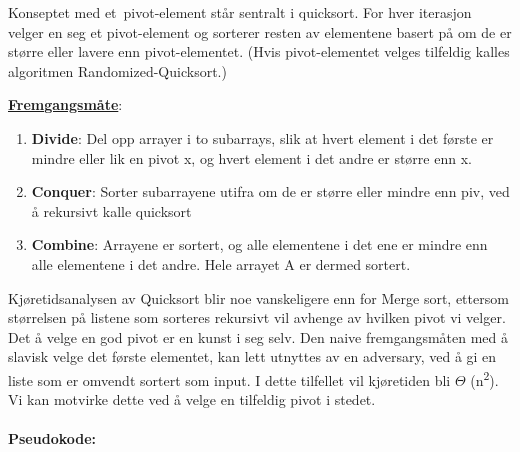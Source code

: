 \documentclass[12pt]{report}
\begin{document}
\setlength{\parskip}{0.0pt}
Konseptet med et pivot-element står sentralt i quicksort. For hver iterasjon velger en seg et pivot-element og sorterer resten av elementene basert på om de er større eller lavere enn pivot-elementet. (Hvis pivot-elementet velges tilfeldig kalles algoritmen Randomized-Quicksort.)\par

\textbf{\uline{Fremgangsmåte}}:\par

\begin{enumerate}[label*=\arabic*.]
	\item \textbf{Divide}: Del opp arrayer i to subarrays, slik at hvert element i det første er mindre eller lik en pivot x, og hvert element i det andre er større enn x.\par

	\item \textbf{Conquer}: Sorter subarrayene utifra om de er større eller mindre enn piv, ved å rekursivt kalle quicksort\par

	\item \textbf{Combine}: Arrayene er sortert, og alle elementene i det ene er mindre enn alle elementene i det andre. Hele arrayet A er dermed sortert.
\end{enumerate}\par

Kjøretidsanalysen av Quicksort blir noe vanskeligere enn for Merge sort, ettersom størrelsen på listene som sorteres rekursivt vil avhenge av hvilken pivot vi velger. Det å velge en god pivot er en kunst i seg selv. Den naive fremgangsmåten med å slavisk velge det første elementet, kan lett utnyttes av en adversary, ved å gi en liste som er omvendt sortert som input. I dette tilfellet vil kjøretiden bli $ \Theta $ (n\textsuperscript{2}). Vi kan motvirke dette ved å velge en tilfeldig pivot i stedet.\par

\paragraph*{Pseudokode:}
\end{document}

